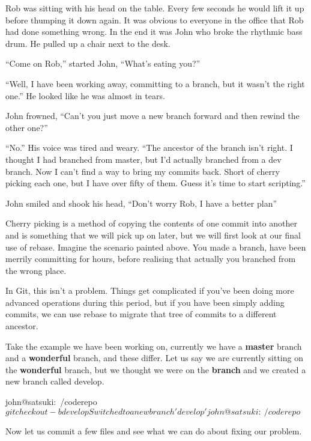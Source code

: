 \begin{trenches}
Rob was sitting with his head on the table.
Every few seconds he would lift it up before thumping it down again.
It was obvious to everyone in the office that Rob had done something wrong.
In the end it was John who broke the rhythmic bass drum.
He pulled up a chair next to the desk.

``Come on Rob,'' started John, ``What's eating you?''

``Well, I have been working away, committing to a branch, but it wasn't the right one.''
He looked like he was almost in tears.

John frowned, ``Can't you just move a new branch forward and then rewind the other one?''

``No.'' His voice was tired and weary.
``The ancestor of the branch isn't right. I thought I had branched from master, but I'd actually branched from a dev branch. Now I can't find a way to bring my commits back. Short of cherry picking each one, but I have over fifty of them. Guess it's time to start scripting.''

John smiled and shook his head, ``Don't worry Rob, I have a better plan''
\end{trenches}

Cherry picking is a method of copying the contents of one commit into another and is something that we will pick up on later, but we will first look at our final use of rebase.
Imagine the scenario painted above.
You made a branch, have been merrily committing for hours, before realising that actually you branched from the wrong place.

In Git, this isn't a problem.
Things get complicated if you've been doing more advanced operations during this period, but if you have been simply adding commits, we can use rebase to migrate that tree of commits to a different ancestor.

Take the example we have been working on, currently we have a \textbf{master} branch and a \textbf{wonderful} branch, and these differ.
Let us say we are currently sitting on the \textbf{wonderful} branch, but we thought we were on the \textbf{branch} and we created a new branch called develop.

\begin{code}
john@satsuki:~/coderepo$ git checkout -b develop
Switched to a new branch 'develop'
john@satsuki:~/coderepo$
\end{code}

Now let us commit a few files and see what we can do about fixing our problem.

